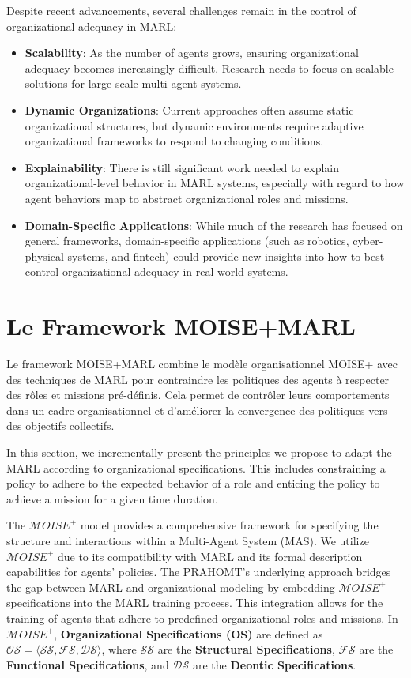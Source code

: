 \documentclass[sigconf,anonymous]{aamas}
\begin{document}
Despite recent advancements, several challenges remain in the control of organizational adequacy in MARL:

\begin{itemize}
    \item \textbf{Scalability}: As the number of agents grows, ensuring organizational adequacy becomes increasingly difficult. Research needs to focus on scalable solutions for large-scale multi-agent systems.
    \item \textbf{Dynamic Organizations}: Current approaches often assume static organizational structures, but dynamic environments require adaptive organizational frameworks to respond to changing conditions.
    \item \textbf{Explainability}: There is still significant work needed to explain organizational-level behavior in MARL systems, especially with regard to how agent behaviors map to abstract organizational roles and missions.
    \item \textbf{Domain-Specific Applications}: While much of the research has focused on general frameworks, domain-specific applications (such as robotics, cyber-physical systems, and fintech) could provide new insights into how to best control organizational adequacy in real-world systems.
\end{itemize}



\section{Le Framework MOISE+MARL}
\label{sec:moise_marl_framework}

Le framework MOISE+MARL combine le modèle organisationnel MOISE+ avec des techniques de MARL pour contraindre les politiques des agents à respecter des rôles et missions pré-définis. Cela permet de contrôler leurs comportements dans un cadre organisationnel et d'améliorer la convergence des politiques vers des objectifs collectifs.

In this section, we incrementally present the principles we propose to adapt the MARL according to organizational specifications. This includes constraining a policy to adhere to the expected behavior of a role and enticing the policy to achieve a mission for a given time duration.


The $\mathcal{M}OISE^+$ model provides a comprehensive framework for specifying the structure and interactions within a Multi-Agent System (MAS). We utilize $\mathcal{M}OISE^+$ due to its compatibility with MARL and its formal description capabilities for agents' policies. The PRAHOMT's underlying approach bridges the gap between MARL and organizational modeling by embedding $\mathcal{M}OISE^+$ specifications into the MARL training process. This integration allows for the training of agents that adhere to predefined organizational roles and missions.
%
In $\mathcal{M}OISE^+$, \textbf{Organizational Specifications (OS)} are defined as $\mathcal{OS} = \langle \mathcal{SS}, \mathcal{FS}, \mathcal{DS} \rangle$, where $\mathcal{SS}$ are the \textbf{Structural Specifications}, $\mathcal{FS}$ are the \textbf{Functional Specifications}, and $\mathcal{DS}$ are the \textbf{Deontic Specifications}.
\end{document}
